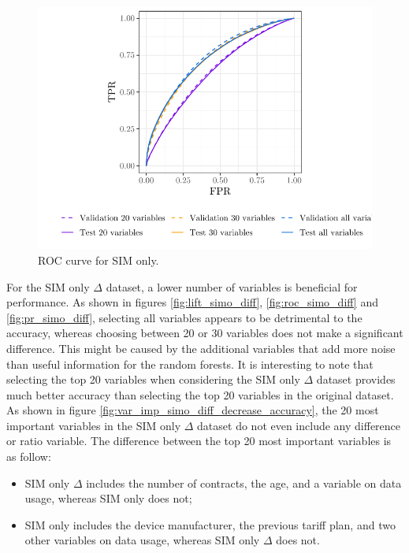 \begin{figure}
    \centering
    \includegraphics[width=0.9\linewidth]{figures/roc_simo.pdf}
    \caption{ROC curve for SIM only.}
    \label{fig:roc_simo}
\end{figure}

For the SIM only $\Delta$ dataset, a lower number of variables is beneficial for
performance. As shown in figures \ref{fig:lift_simo_diff},
\ref{fig:roc_simo_diff} and \ref{fig:pr_simo_diff}, selecting all variables
appears to be detrimental to the accuracy, whereas choosing between 20 or 30
variables does not make a significant difference. This might be caused by the
additional variables that add more noise than useful information for the random
forests. It is interesting to note that selecting the top 20 variables when
considering the SIM only $\Delta$ dataset provides much better accuracy than
selecting the top 20 variables in the original dataset. As shown in figure
\ref{fig:var_imp_simo_diff_decrease_accuracy}, the 20 most important variables
in the SIM only $\Delta$ dataset do not even include any difference or ratio
variable. The difference between the top 20 most important variables is as
follow:

\begin{itemize}
    \item SIM only $\Delta$ includes the number of contracts, the age, and a
    variable on data usage, whereas SIM only does not;
    \item SIM only includes the device manufacturer, the previous tariff plan,
    and two other variables on data usage, whereas SIM only $\Delta$ does not.
\end{itemize}

